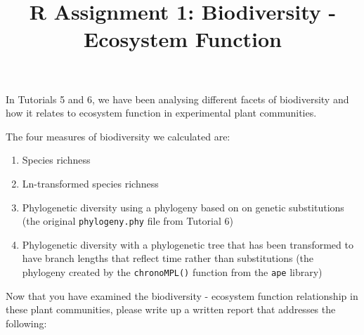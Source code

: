 \documentclass[]{article}
\title{R Assignment 1: Biodiversity - Ecosystem Function}
\author{}
\date{}
\providecommand{\tightlist}{%
  \setlength{\itemsep}{0pt}\setlength{\parskip}{0pt}}
\begin{document}
\maketitle

In Tutorials 5 and 6, we have been analysing different facets of
biodiversity and how it relates to ecosystem function in experimental
plant communities.

The four measures of biodiversity we calculated are:

\begin{enumerate}
\def\labelenumi{\arabic{enumi}.}
\tightlist
\item
  Species richness
\item
  Ln-transformed species richness
\item
  Phylogenetic diversity using a phylogeny based on on genetic
  substitutions (the original \texttt{phylogeny.phy} file from Tutorial
  6)
\item
  Phylogenetic diversity with a phylogenetic tree that has been
  transformed to have branch lengths that reflect time rather than
  substitutions (the phylogeny created by the \texttt{chronoMPL()}
  function from the \texttt{ape} library)
\end{enumerate}

Now that you have examined the biodiversity - ecosystem function
relationship in these plant communities, please write up a written
report that addresses the following:
\end{document}
